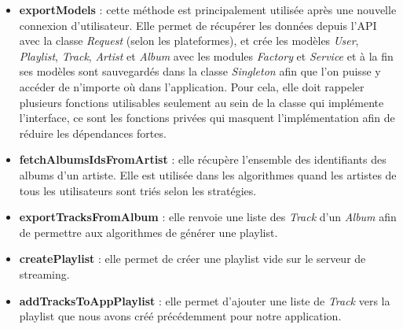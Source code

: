 \documentclass[12pt, openany]{report}
\begin{document}
\begin{itemize}
    \item \textbf{exportModels} : cette méthode est principalement utilisée après une nouvelle connexion d'utilisateur. Elle permet de récupérer les données depuis l'API avec la classe \textit{Request} (selon les plateformes), et crée les modèles \textit{User}, \textit{Playlist}, \textit{Track}, \textit{Artist} et \textit{Album} avec les modules \textit{Factory} et \textit{Service} et à la fin ses modèles sont sauvegardés dans la classe \textit{Singleton} afin que l'on puisse y accéder de n'importe où dans l'application. Pour cela, elle doit rappeler plusieurs fonctions utilisables seulement au sein de la classe qui implémente l'interface, ce sont les fonctions privées qui masquent l'implémentation afin de réduire les dépendances fortes.
    
    \item  \textbf{fetchAlbumsIdsFromArtist} : elle récupère l'ensemble des identifiants des albums d'un artiste. Elle est utilisée dans les algorithmes quand les artistes de tous les utilisateurs sont triés selon les stratégies. 
    
    \item \textbf{exportTracksFromAlbum} : elle renvoie une liste des \textit{Track} d'un \textit{Album} afin de permettre aux algorithmes de générer une playlist.
        
    \item \textbf{createPlaylist} : elle permet de créer une playlist vide sur le serveur de streaming.
    
    \item \textbf{addTracksToAppPlaylist} : elle permet d'ajouter une liste de \textit{Track} vers la playlist que nous avons créé précédemment pour notre application.
\end{itemize}
\newpage
\end{document}
